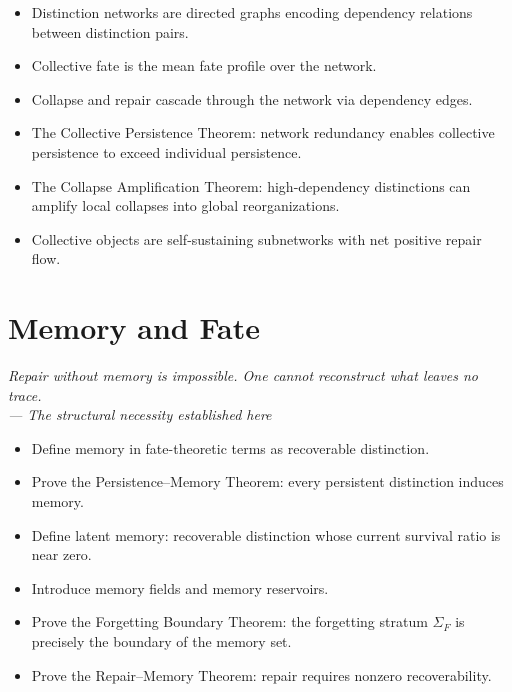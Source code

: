 \documentclass[12pt,twoside,openright]{book}
\newcommand{\strataF}{\Sigma_{F}}   %
\newenvironment{epigraph}[2]{%
  \vspace{1em}\begin{flushright}
  \begin{minipage}{0.72\textwidth}
  \itshape\small #1\\[0.4em]
  \upshape\footnotesize\sffamily\color{DistGray}--- #2
  \end{minipage}\end{flushright}\vspace{1.5em}}{}
\newenvironment{objectives}{%
  \begin{tcolorbox}[colback=DistBlue!5,colframe=DistBlue,
    title={\faCheckCircle\enspace Chapter Objectives},
    fonttitle=\sffamily\bfseries\color{white},
    attach boxed title to top left={yshift=-2mm,xshift=4mm},
    boxed title style={colback=DistBlue},breakable]
  \begin{itemize}[leftmargin=*,nosep]}{%
  \end{itemize}\end{tcolorbox}\vspace{1em}}
\newenvironment{chapsummary}{%
  \begin{tcolorbox}[colback=DistBlue!5,colframe=DistBlue,
    title={\faBookOpen\enspace Summary},
    fonttitle=\sffamily\bfseries\color{white},
    attach boxed title to top left={yshift=-2mm,xshift=4mm},
    boxed title style={colback=DistBlue,rounded corners}]
  \begin{itemize}[nosep,leftmargin=*]}{%
  \end{itemize}\end{tcolorbox}}
\providecommand{\strataF}{\Sigma_{F}}
\begin{document}
\begin{chapsummary}
\item Distinction networks are directed graphs encoding
  dependency relations between distinction pairs.
\item Collective fate is the mean fate profile over the network.
\item Collapse and repair cascade through the network via
  dependency edges.
\item The Collective Persistence Theorem: network redundancy
  enables collective persistence to exceed individual
  persistence.
\item The Collapse Amplification Theorem: high-dependency
  distinctions can amplify local collapses into global
  reorganizations.
\item Collective objects are self-sustaining subnetworks with
  net positive repair flow.
\end{chapsummary}


\chapter{Memory and Fate}
\label{ch:memory-fate}

\begin{epigraph}{Repair without memory is impossible. One cannot
  reconstruct what leaves no trace.}{The structural necessity
  established here}
\end{epigraph}

\begin{objectives}
\item Define memory in fate-theoretic terms as recoverable
  distinction.
\item Prove the Persistence–Memory Theorem: every persistent
  distinction induces memory.
\item Define latent memory: recoverable distinction whose
  current survival ratio is near zero.
\item Introduce memory fields and memory reservoirs.
\item Prove the Forgetting Boundary Theorem: the forgetting
  stratum $\strataF$ is precisely the boundary of the memory
  set.
\item Prove the Repair–Memory Theorem: repair requires nonzero
  recoverability.
\end{objectives}
\end{document}
